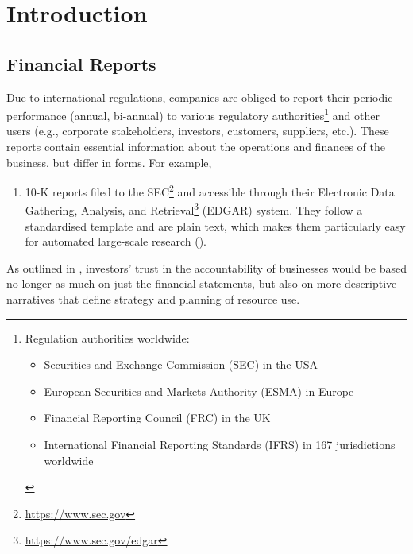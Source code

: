 \section{Introduction}
\subsection{Financial Reports}
Due to international regulations, companies are obliged to report their periodic performance (annual, bi-annual) to various regulatory authorities\footnote{Regulation authorities worldwide:
\begin{itemize}
    \item Securities and Exchange Commission (SEC) in the USA
    \item European Securities and Markets Authority (ESMA) in Europe
    \item Financial Reporting Council (FRC) in the UK
    \item International Financial Reporting Standards (IFRS) in 167 jurisdictions worldwide
\end{itemize}
} and other users (e.g., corporate stakeholders, investors, customers, suppliers, etc.). These reports contain essential information about the operations and finances of the business, but differ in forms. For example,
\begin{enumerate}
    \item 10-K reports filed to the SEC\footnote{\url{https://www.sec.gov}} and accessible through their Electronic Data Gathering, Analysis, and Retrieval\footnote{\url{https://www.sec.gov/edgar}} (EDGAR) system. They follow a standardised template and are plain text, which makes them particularly easy for automated large-scale research (\cite{el-haj2019retrieving}). 
\end{enumerate}

As outlined in \cite{elliott1998accounting}, investors’ trust in the accountability of businesses would be based no longer as much on just the financial statements, but also on more descriptive narratives that define strategy and planning of resource use. 
